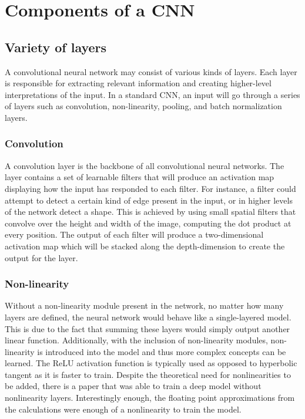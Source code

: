 \chapter{Components of a CNN}

\section{Variety of layers}
A convolutional neural network may consist of various kinds of layers.
Each layer is responsible for extracting relevant information and creating higher-level interpretations of the input.
In a standard CNN, an input will go through a series of layers such as convolution, non-linearity, pooling, and batch normalization layers.

\subsection{Convolution}
A convolution layer is the backbone of all convolutional neural networks.
The layer contains a set of learnable filters that will produce an activation map displaying how the input has responded to each filter.
For instance, a filter could attempt to detect a certain kind of edge present in the input, or in higher levels of the network detect a shape.
This is achieved by using small spatial filters that convolve over the height and width of the image, computing the dot product at every position.
The output of each filter will produce a two-dimensional activation map which will be stacked along the depth-dimension to create the output for the layer.

\subsection{Non-linearity}
Without a non-linearity module present in the network, no matter how many layers are defined, the neural network would behave like a single-layered model. 
This is due to the fact that summing these layers would simply output another linear function.
Additionally, with the inclusion of non-linearity modules, non-linearity is introduced into the model and thus more complex concepts can be learned.
The ReLU activation function is typically used as opposed to hyperbolic tangent as it is faster to train.
Despite the theoretical need for nonlinearities to be added, there is a paper that was able to train a deep model without nonlinearity layers.
Interestingly enough, the floating point approximations from the calculations were enough of a nonlinearity to train the model.

